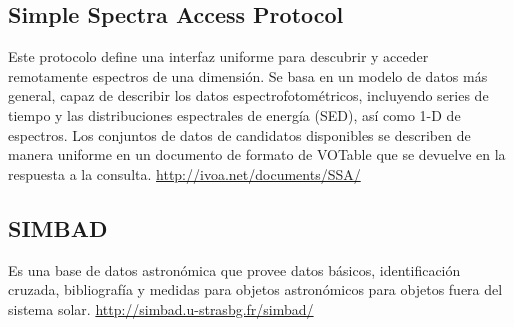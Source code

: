 \subsection{Simple Spectra Access Protocol}


Este protocolo define una interfaz uniforme para descubrir y acceder
remotamente espectros de una dimensión. Se basa en un modelo de datos más
general, capaz de describir los datos espectrofotométricos, incluyendo series
de tiempo y las distribuciones espectrales de energía (SED), así como 1-D de
espectros. Los conjuntos de datos de candidatos disponibles se describen de
manera uniforme en un documento de formato de VOTable que se devuelve en la
respuesta a la consulta. \url{http://ivoa.net/documents/SSA/}

\subsection{SIMBAD}


Es una base de datos astronómica que provee datos básicos, identificación
cruzada, bibliografía y medidas para objetos astronómicos para objetos fuera
del sistema solar. \url{http://simbad.u-strasbg.fr/simbad/}
